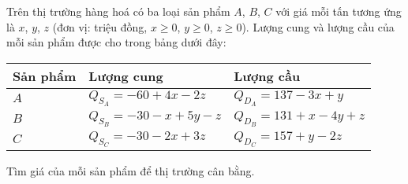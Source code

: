 
\begin{bt} %
Trên thị trường hàng hoá có ba loại sản phẩm $A$, $B$, $C$ với giá mỗi tấn tương ứng là $x$, $y$, $z$ (đơn vị: triệu đồng, $x \ge 0$, $y \ge 0$, $z \ge 0$). Lượng cung và lượng cầu của mỗi sản phẩm được cho trong bảng dưới đây:
\begin{center}
\begin{tabular}{|p{2cm}|p{5cm}|p{5cm}|}
\hline
Sản phẩm & Lượng cung & Lượng cầu \\
\hline
$A$ & $Q_{S_A}=-60+4x-2z$ & $Q_{D_A}=137-3x+y$ \\
\hline
$B$ & $Q_{S_B}=-30-x+5y-z$ & $Q_{D_B}=131+x-4y+z$ \\
\hline
$C$ & $Q_{S_C}=-30-2x+3z$ & $Q_{D_C}=157+y-2z$ \\
\hline
\end{tabular}
\end{center}
Tìm giá của mỗi sản phẩm để thị trường cân bằng.
\end{bt}
